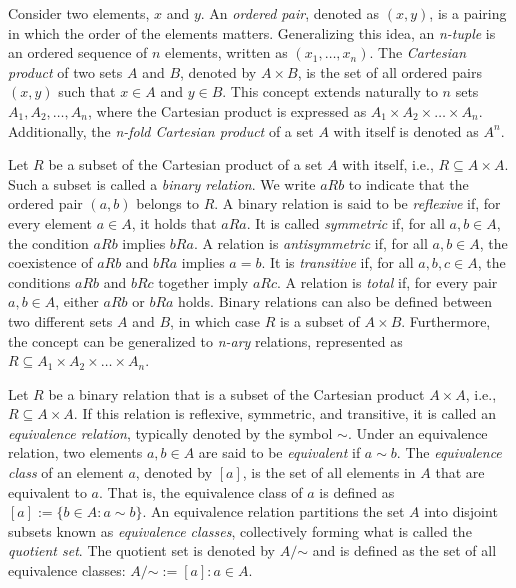
Consider two elements, $x$ and $y$. An \emph{ordered pair}, denoted as $(x, y)$, is a pairing in which the order of the elements matters. Generalizing this idea, an \emph{n-tuple} is an ordered sequence of $n$ elements, written as $(x_1, \ldots, x_n)$. The \emph{Cartesian product} of two sets $A$ and $B$, denoted by $A \times B$, is the set of all ordered pairs $(x, y)$ such that $x \in A$ and $y \in B$. This concept extends naturally to $n$ sets $A_1, A_2, \dots, A_n$, where the Cartesian product is expressed as $A_1 \times A_2 \times \dots \times A_n$. Additionally, the \emph{n-fold Cartesian product} of a set $A$ with itself is denoted as $A^n$.

Let $R$ be a subset of the Cartesian product of a set $A$ with itself, i.e., $R \subseteq A \times A$. Such a subset is called a \emph{binary relation}. We write $aRb$ to indicate that the ordered pair $(a, b)$ belongs to $R$. A binary relation is said to be \emph{reflexive} if, for every element $a \in A$, it holds that $aRa$. It is called \emph{symmetric} if, for all $a, b \in A$, the condition $aRb$ implies $bRa$. A relation is \emph{antisymmetric} if, for all $a, b \in A$, the coexistence of $aRb$ and $bRa$ implies $a = b$. It is \emph{transitive} if, for all $a, b, c \in A$, the conditions $aRb$ and $bRc$ together imply $aRc$. A relation is \emph{total} if, for every pair $a, b \in A$, either $aRb$ or $bRa$ holds. Binary relations can also be defined between two different sets $A$ and $B$, in which case $R$ is a subset of $A \times B$. Furthermore, the concept can be generalized to \emph{n-ary} relations, represented as $R \subseteq A_1 \times A_2 \times \dots \times A_n$.

Let $R$ be a binary relation that is a subset of the Cartesian product $A \times A$, i.e., $R \subseteq A \times A$. If this relation is reflexive, symmetric, and transitive, it is called an \emph{equivalence relation}, typically denoted by the symbol $\sim$. Under an equivalence relation, two elements $a, b \in A$ are said to be \emph{equivalent} if $a \sim b$. The \emph{equivalence class} of an element $a$, denoted by $[a]$, is the set of all elements in $A$ that are equivalent to $a$. That is, the equivalence class of $a$ is defined as $[a] := \{ b \in A : a \sim b \}$. An equivalence relation partitions the set $A$ into disjoint subsets known as \emph{equivalence classes}, collectively forming what is called the \emph{quotient set}. The quotient set is denoted by $A / {\mathord {\sim }}$ and is defined as the set of all equivalence classes: $A / {\mathord {\sim }} := { [a] : a \in A }$.

